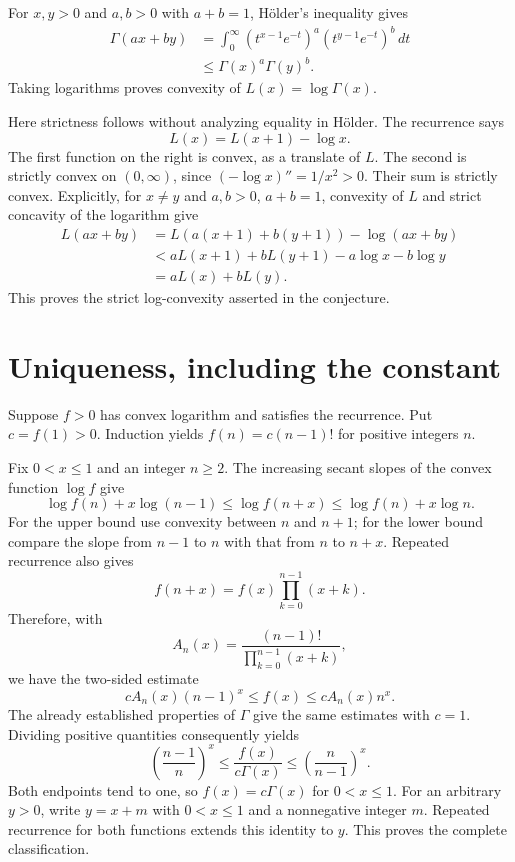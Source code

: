 \documentclass[11pt]{article}
\begin{document}
For $x,y>0$ and $a,b>0$ with $a+b=1$, H\"older's inequality gives
\begin{align*}
\Gamma(ax+by)
 &=\int_0^\infty(t^{x-1}e^{-t})^a(t^{y-1}e^{-t})^b\,dt\\
 &\le \Gamma(x)^a\Gamma(y)^b.
\end{align*}
Taking logarithms proves convexity of $L(x)=\log\Gamma(x)$.

Here strictness follows without analyzing equality in H\"older. The recurrence says
\[
L(x)=L(x+1)-\log x.
\]
The first function on the right is convex, as a translate of $L$. The second is strictly convex on $(0,\infty)$, since $(-\log x)''=1/x^2>0$. Their sum is strictly convex. Explicitly, for $x\ne y$ and $a,b>0$, $a+b=1$, convexity of $L$ and strict concavity of the logarithm give
\begin{align*}
L(ax+by)
 &=L(a(x+1)+b(y+1))-\log(ax+by)\\
 &<aL(x+1)+bL(y+1)-a\log x-b\log y\\
 &=aL(x)+bL(y).
\end{align*}
This proves the strict log-convexity asserted in the conjecture.

\section{Uniqueness, including the constant}
Suppose $f>0$ has convex logarithm and satisfies the recurrence. Put $c=f(1)>0$. Induction yields $f(n)=c(n-1)!$ for positive integers $n$.

Fix $0<x\le1$ and an integer $n\ge2$. The increasing secant slopes of the convex function $\log f$ give
\[
\log f(n)+x\log(n-1)
 \le\log f(n+x)
 \le\log f(n)+x\log n.
\]
For the upper bound use convexity between $n$ and $n+1$; for the lower bound compare the slope from $n-1$ to $n$ with that from $n$ to $n+x$. Repeated recurrence also gives
\[
f(n+x)=f(x)\prod_{k=0}^{n-1}(x+k).
\]
Therefore, with
\[
A_n(x)=\frac{(n-1)!}{\prod_{k=0}^{n-1}(x+k)},
\]
we have the two-sided estimate
\[
cA_n(x)(n-1)^x\le f(x)\le cA_n(x)n^x.
\]
The already established properties of $\Gamma$ give the same estimates with $c=1$. Dividing positive quantities consequently yields
\[
\left(\frac{n-1}{n}\right)^x
\le\frac{f(x)}{c\Gamma(x)}
\le\left(\frac{n}{n-1}\right)^x.
\]
Both endpoints tend to one, so $f(x)=c\Gamma(x)$ for $0<x\le1$. For an arbitrary $y>0$, write $y=x+m$ with $0<x\le1$ and a nonnegative integer $m$. Repeated recurrence for both functions extends this identity to $y$. This proves the complete classification.
\end{document}
